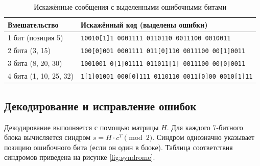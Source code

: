 \begin{table}[H]
    \centering
    \small
    \caption{Искажённые сообщения с выделенными ошибочными битами}
    \label{tab:corrupt}
    \begin{tabular}{|l|l|}
        \toprule
        Вмешательство & Искажённый код (выделены ошибки) \\
        \midrule
        1 бит (позиция 5) & \texttt{10010[1]1 0001111 0110110 0011100 0010011} \\
        2 бита (3, 15) & \texttt{100[0]001 0001111 011[0]110 0011100 00[1]0011} \\
        3 бита (8, 20, 30) & \texttt{1001001 0[1]01111 011011[1] 0011100 00[0]0011} \\
        4 бита (1, 10, 25, 32) & \texttt{1[1]01001 000[0]111 0110110 0011[0]00 0010[1]11} \\
        \bottomrule
    \end{tabular}
\end{table}

\subsection{Декодирование и исправление ошибок}
Декодирование выполняется с помощью матрицы $H$. Для каждого 7-битного блока вычисляется синдром $s = H \cdot c^T \pmod{2}$. Синдром однозначно указывает позицию ошибочного бита (если он один в блоке). Таблица соответствия синдромов приведена на рисунке \ref{fig:syndrome}.

\begin{center}
\end{center}
\label{fig:syndrome}

